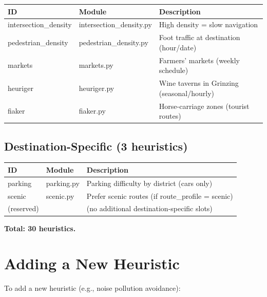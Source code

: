 \documentclass[12pt,a4paper]{article}
\begin{document}
\begin{table}[H]
\centering
\small
\begin{tabular}{lll}
\toprule
\textbf{ID} & \textbf{Module} & \textbf{Description} \\
\midrule
intersection\_density & intersection\_density.py & High density = slow navigation \\
pedestrian\_density & pedestrian\_density.py & Foot traffic at destination (hour/date) \\
markets & markets.py & Farmers' markets (weekly schedule) \\
heuriger & heuriger.py & Wine taverns in Grinzing (seasonal/hourly) \\
fiaker & fiaker.py & Horse-carriage zones (tourist routes) \\
\bottomrule
\end{tabular}
\end{table}

\subsection{Destination-Specific (3 heuristics)}

\begin{table}[H]
\centering
\small
\begin{tabular}{lll}
\toprule
\textbf{ID} & \textbf{Module} & \textbf{Description} \\
\midrule
parking & parking.py & Parking difficulty by district (cars only) \\
scenic & scenic.py & Prefer scenic routes (if route\_profile = scenic) \\
(reserved) & & (no additional destination-specific slots) \\
\bottomrule
\end{tabular}
\end{table}

\textbf{Total: 30 heuristics.}

\newpage

\section{Adding a New Heuristic}

To add a new heuristic (e.g., noise pollution avoidance):
\end{document}
